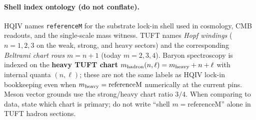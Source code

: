%

\paragraph{Shell index ontology (do not conflate).}
HQIV names \texttt{referenceM} for the substrate lock-in shell used in cosmology,
CMB readouts, and the single-scale mass witness.
TUFT names \emph{Hopf windings} ($n=1,2,3$ on the weak, strong, and heavy sectors)
and the corresponding \emph{Beltrami chart rows} $m=n+1$ (today $m=2,3,4$).
Baryon spectroscopy is indexed on the \textbf{heavy TUFT chart}
$m_{\rm hadron}(n,\ell)=m_{\rm heavy}+n+\ell$ with internal quanta $(n,\ell)$;
these are not the same labels as HQIV lock-in bookkeeping even when
$m_{\rm heavy}=\mathrm{referenceM}$ numerically at the current pins.
Meson vector grounds use the strong/heavy chart ratio $3/4$.
When comparing to data, state which chart is primary; do not write
``shell $m=\mathrm{referenceM}$'' alone in TUFT hadron sections.
